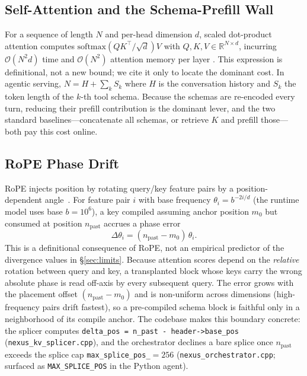 \documentclass[10pt,conference]{IEEEtran}
\newcommand{\code}[1]{\texttt{\small #1}}
\begin{document}
\subsection{Self-Attention and the Schema-Prefill Wall}
For a sequence of length $N$ and per-head dimension $d$, scaled dot-product attention
computes $\mathrm{softmax}(QK^\top/\sqrt{d})V$ with $Q,K,V\in\mathbb{R}^{N\times d}$,
incurring $\mathcal{O}(N^2 d)$ time and $\mathcal{O}(N^2)$ attention memory per layer
\cite{vaswani2017attention}. This expression is definitional, not a new bound; we cite it
only to locate the dominant cost. In agentic serving, $N=H+\sum_{k}S_k$ where $H$ is the
conversation history and $S_k$ the token length of the $k$-th tool schema. Because the
schemas are re-encoded every turn, reducing their prefill contribution is the dominant lever,
and the two standard baselines---concatenate all schemas, or retrieve $K$ and prefill
those---both pay this cost online.

\subsection{RoPE Phase Drift}
\label{sec:rope}
RoPE injects position by rotating query/key feature pairs by a position-dependent
angle~\cite{su2024roformer}. For feature pair $i$ with base frequency $\theta_i=b^{-2i/d}$
(the runtime model uses base $b=10^6$), a key compiled assuming anchor position $m_0$ but
consumed at position $n_{\mathrm{past}}$ accrues a phase error
\begin{equation}
\Delta\theta_i = (n_{\mathrm{past}}-m_0)\,\theta_i .
\label{eq:drift}
\end{equation}
This is a definitional consequence of RoPE, not an empirical predictor of the divergence
values in \S\ref{sec:limits}. Because attention scores depend on the \emph{relative} rotation
between query and key, a transplanted block whose keys carry the wrong absolute phase is read
off-axis by every subsequent query. The error grows with the placement offset
$(n_{\mathrm{past}}-m_0)$ and is non-uniform across dimensions (high-frequency pairs drift
fastest), so a pre-compiled schema block is faithful only in a neighborhood of its compile
anchor. The codebase makes this boundary concrete: the splicer computes
\code{delta\_pos = n\_past - header->base\_pos} (\code{nexus\_kv\_splicer.cpp}), and the
orchestrator declines a bare splice once $n_{\mathrm{past}}$ exceeds the splice cap
\code{max\_splice\_pos\_}${}=256$ (\code{nexus\_orchestrator.cpp}; surfaced as \code{MAX\_SPLICE\_POS}
in the Python agent).
\end{document}
